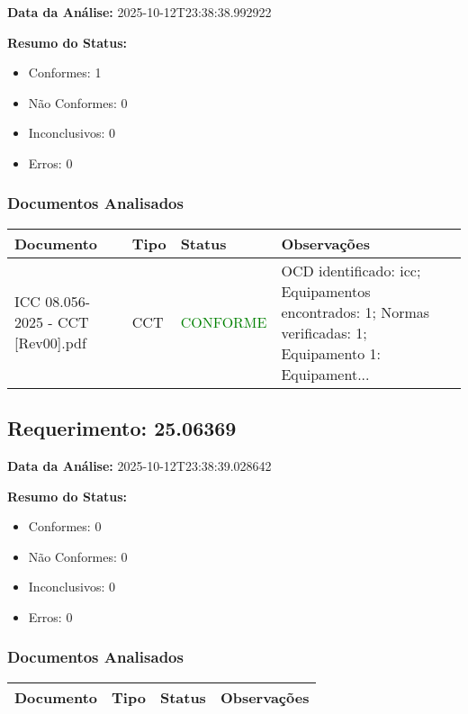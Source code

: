 \documentclass[12pt,a4paper]{article}
\begin{document}
\textbf{Data da Análise:} 2025-10-12T23:38:38.992922

\textbf{Resumo do Status:}
\begin{itemize}
    \item Conformes: 1
    \item Não Conformes: 0
    \item Inconclusivos: 0
    \item Erros: 0
\end{itemize}

\subsubsection{Documentos Analisados}

\begin{longtable}{|p{4cm}|p{2cm}|p{2cm}|p{6cm}|}
\hline
\textbf{Documento} & \textbf{Tipo} & \textbf{Status} & \textbf{Observações} \\
\hline
\endhead
ICC 08.056-2025 - CCT [Rev00].pdf & CCT & \textcolor{green}{CONFORME} & OCD identificado: icc; Equipamentos encontrados: 1; Normas verificadas: 1; Equipamento 1: Equipament... \\
\hline
\end{longtable}


\subsection{Requerimento: 25.06369}

\textbf{Data da Análise:} 2025-10-12T23:38:39.028642

\textbf{Resumo do Status:}
\begin{itemize}
    \item Conformes: 0
    \item Não Conformes: 0
    \item Inconclusivos: 0
    \item Erros: 0
\end{itemize}

\subsubsection{Documentos Analisados}

\begin{longtable}{|p{4cm}|p{2cm}|p{2cm}|p{6cm}|}
\hline
\textbf{Documento} & \textbf{Tipo} & \textbf{Status} & \textbf{Observações} \\
\hline
\endhead
\end{longtable}
\end{document}
